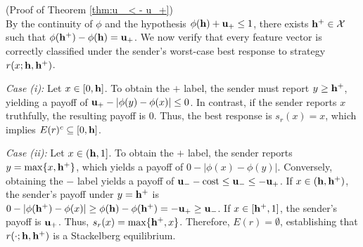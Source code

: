 \begin{apdxproof}(Proof of Theorem \ref{thm:u_ < - u_+})\label{proof:u_ < - u_+}\\
By the continuity of $\phi$ and the hypothesis $\phi(\mathbf{h}) + \mathbf{u_+} \le 1$, there exists $\mathbf{h^{+}} \in \mathcal{X}$ such that $\phi(\mathbf{h^{+}}) - \phi(\mathbf{h}) = \mathbf{u_+}$. We now verify that every feature vector is correctly classified under the sender's worst-case best response to strategy $r(x;\mathbf{h},\mathbf{h^{+}})$.

\noindent \textit{Case (i):} Let $x \in [0,\mathbf{h}]$. To obtain the $\plus$ label, the sender must report $y \ge \mathbf{h^{+}}$, yielding a payoff of $\mathbf{u_+} - |\phi(y) - \phi(x)| \le 0$. In contrast, if the sender reports $x$ truthfully, the resulting payoff is $0$. Thus, the best response is $s_r(x) = x$, which implies $E(r)^c \subseteq [0,\mathbf{h}]$.

\noindent \textit{Case (ii):} Let $x \in (\mathbf{h}, 1]$. To obtain the $\plus$ label, the sender reports $y = \max\{x, \mathbf{h^{+}}\}$, which yields a payoff of $0 - |\phi(x) - \phi(y)|$. Conversely, obtaining the $\minus$ label yields a payoff of $\mathbf{u_-} - \text{cost} \le \mathbf{u_-} \le -\mathbf{u_+}$. If $x \in (\mathbf{h}, \mathbf{h^{+}})$, the sender's payoff under $y = \mathbf{h^{+}}$ is $0 - |\phi(\mathbf{h^{+}}) - \phi(x)| \ge \phi(\mathbf{h}) - \phi(\mathbf{h^{+}}) = -\mathbf{u_+} \ge \mathbf{u_-}$. If $x \in [\mathbf{h^{+}}, 1]$, the sender's payoff is $\mathbf{u_+}$.
\noindent Thus, $s_r(x) = \max\{\mathbf{h^{+}}, x\}$.
Therefore, $E(r) = \emptyset$, establishing that $r(\cdot; \mathbf{h}, \mathbf{h^{+}})$ is a Stackelberg equilibrium.
\end{apdxproof}


